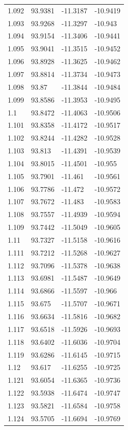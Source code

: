 \begin{tabular}{llll}
1.092 & 93.9381 & -11.3187 & -10.9419 \\
1.093 & 93.9268 & -11.3297 & -10.943 \\
1.094 & 93.9154 & -11.3406 & -10.9441 \\
1.095 & 93.9041 & -11.3515 & -10.9452 \\
1.096 & 93.8928 & -11.3625 & -10.9462 \\
1.097 & 93.8814 & -11.3734 & -10.9473 \\
1.098 & 93.87 & -11.3844 & -10.9484 \\
1.099 & 93.8586 & -11.3953 & -10.9495 \\
1.1 & 93.8472 & -11.4063 & -10.9506 \\
1.101 & 93.8358 & -11.4172 & -10.9517 \\
1.102 & 93.8244 & -11.4282 & -10.9528 \\
1.103 & 93.813 & -11.4391 & -10.9539 \\
1.104 & 93.8015 & -11.4501 & -10.955 \\
1.105 & 93.7901 & -11.461 & -10.9561 \\
1.106 & 93.7786 & -11.472 & -10.9572 \\
1.107 & 93.7672 & -11.483 & -10.9583 \\
1.108 & 93.7557 & -11.4939 & -10.9594 \\
1.109 & 93.7442 & -11.5049 & -10.9605 \\
1.11 & 93.7327 & -11.5158 & -10.9616 \\
1.111 & 93.7212 & -11.5268 & -10.9627 \\
1.112 & 93.7096 & -11.5378 & -10.9638 \\
1.113 & 93.6981 & -11.5487 & -10.9649 \\
1.114 & 93.6866 & -11.5597 & -10.966 \\
1.115 & 93.675 & -11.5707 & -10.9671 \\
1.116 & 93.6634 & -11.5816 & -10.9682 \\
1.117 & 93.6518 & -11.5926 & -10.9693 \\
1.118 & 93.6402 & -11.6036 & -10.9704 \\
1.119 & 93.6286 & -11.6145 & -10.9715 \\
1.12 & 93.617 & -11.6255 & -10.9725 \\
1.121 & 93.6054 & -11.6365 & -10.9736 \\
1.122 & 93.5938 & -11.6474 & -10.9747 \\
1.123 & 93.5821 & -11.6584 & -10.9758 \\
1.124 & 93.5705 & -11.6694 & -10.9769 \\

\end{tabular}
